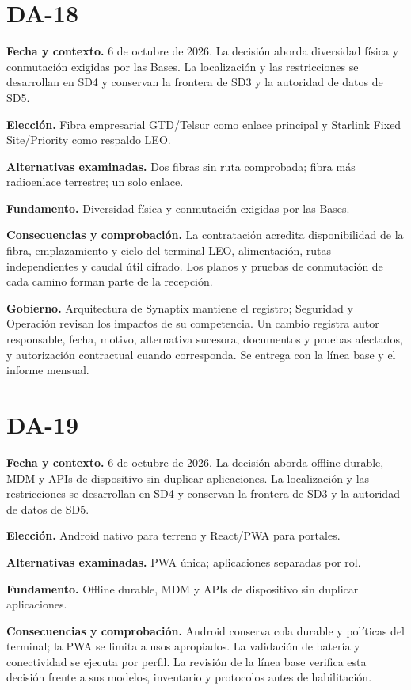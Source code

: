 \documentclass[11pt,letterpaper]{report}
\begin{document}
\section*{DA-18}

\textbf{Fecha y contexto.} 6 de octubre de 2026. La decisión aborda diversidad física y conmutación exigidas por las Bases. La localización y las restricciones se desarrollan en SD4 y conservan la frontera de SD3 y la autoridad de datos de SD5.

\textbf{Elección.} Fibra empresarial GTD/Telsur como enlace principal y Starlink Fixed Site/Priority como respaldo LEO.

\textbf{Alternativas examinadas.} Dos fibras sin ruta comprobada; fibra más radioenlace terrestre; un solo enlace.

\textbf{Fundamento.} Diversidad física y conmutación exigidas por las Bases.

\textbf{Consecuencias y comprobación.} La contratación acredita disponibilidad de la fibra, emplazamiento y cielo del terminal LEO, alimentación, rutas independientes y caudal útil cifrado. Los planos y pruebas de conmutación de cada camino forman parte de la recepción.

\textbf{Gobierno.} Arquitectura de Synaptix mantiene el registro; Seguridad y Operación revisan los impactos de su competencia. Un cambio registra autor responsable, fecha, motivo, alternativa sucesora, documentos y pruebas afectados, y autorización contractual cuando corresponda. Se entrega con la línea base y el informe mensual.

\section*{DA-19}

\textbf{Fecha y contexto.} 6 de octubre de 2026. La decisión aborda offline durable, MDM y APIs de dispositivo sin duplicar aplicaciones. La localización y las restricciones se desarrollan en SD4 y conservan la frontera de SD3 y la autoridad de datos de SD5.

\textbf{Elección.} Android nativo para terreno y React/PWA para portales.

\textbf{Alternativas examinadas.} PWA única; aplicaciones separadas por rol.

\textbf{Fundamento.} Offline durable, MDM y APIs de dispositivo sin duplicar aplicaciones.

\textbf{Consecuencias y comprobación.} Android conserva cola durable y políticas del terminal; la PWA se limita a usos apropiados. La validación de batería y conectividad se ejecuta por perfil. La revisión de la línea base verifica esta decisión frente a sus modelos, inventario y protocolos antes de habilitación.
\end{document}
